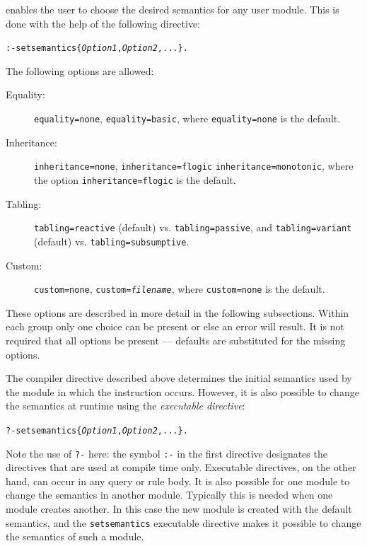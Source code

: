 \documentclass[11pt]{article}
\newcommand{\ERGO}{\mbox{\smaller{\ensuremath{\cal{E}}\smaller{{\sc{RGO}}}}}\xspace}
\newcommand{\FLSYSTEM}{\ERGO}
\begin{document}
\FLSYSTEM enables the user to choose the desired semantics for any user
module. This is done with the help of the following directive:
\begin{alltt}
  :- setsemantics\{\emph{Option1}, \emph{Option2}, ...\}.
\end{alltt}
The following options are allowed:
\begin{description}
  \item[Equality:]  {\tt equality=none}, {\tt equality=basic}, where
  {\tt equality=none} is the default.
\item[Inheritance:] {\tt inheritance=none}, {\tt inheritance=flogic}
  \texttt{inheritance=monotonic},  where the option
  {\tt inheritance=flogic} is the default.
\item[Tabling:] \texttt{tabling=reactive} (default) vs.
  \texttt{tabling=passive}, and \texttt{tabling=variant} (default) vs.
  \texttt{tabling=subsumptive}.
\item[Custom:] {\tt custom=none}, {\tt custom=\emph{filename}}, where
  {\tt custom=none} is the default.
\end{description}
These options are described in more detail in the following
subsections.
Within each group only one choice can be present or else an error will result.
It is not required that all options be present --- defaults are substituted
for the missing options.

The compiler directive described above determines the initial semantics used
by the module in which the instruction occurs. However, it is also possible
to change the semantics at runtime using the \emph{executable directive}:
\begin{alltt}
    ?- setsemantics\{\emph{Option1}, \emph{Option2}, ...\}.
\end{alltt}
Note the use of {\tt ?-} here: the symbol {\tt :-} in the first directive
designates the directives that are used at compile time only.  Executable
directives, on the other hand, can occur in any query or rule body.  It is
also possible for one module to change the semantics in another module.
Typically this is needed when one module creates another. In this case the
new module is created with the default semantics, and the {\tt setsemantics}
executable directive makes it possible to change the semantics of such a
module.
\end{document}
